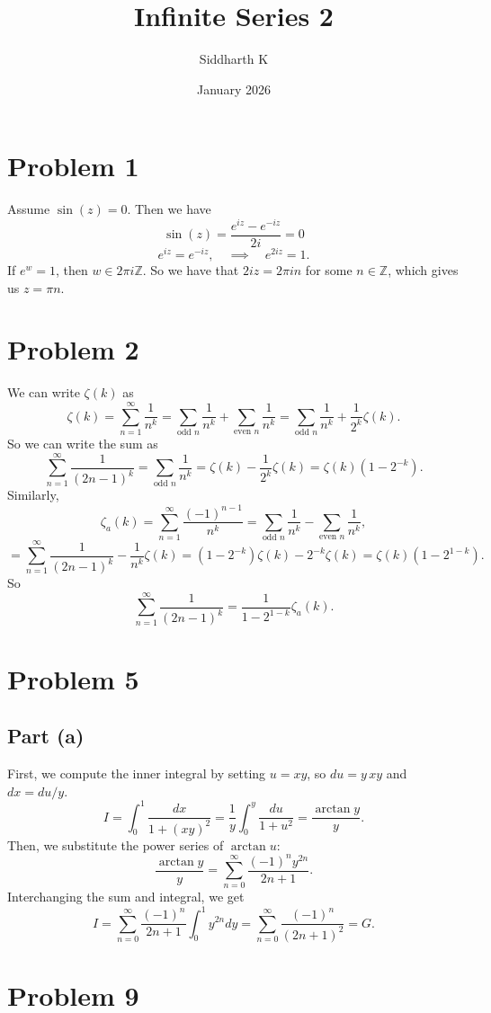 \documentclass{article}
\title{Infinite Series 2}
\author{Siddharth K}
\date{January 2026}
\newcommand{\summation}[1][0]{\sum_{n=#1}^\infty}
\begin{document}
\maketitle

\section*{Problem 1}
Assume $\sin(z) = 0$. Then we have
$$\sin(z) = \frac{e^{iz} - e^{-iz}}{2i} = 0$$
$$e^{iz} = e^{-iz}, \quad \implies \quad e^{2iz} = 1.$$
If $e^w = 1$, then $w \in 2\pi i\mathbb{Z}$. So we have that $2iz = 2\pi in$ for some $n \in \mathbb{Z}$, which gives us $z = \pi n$.

\section*{Problem 2}
We can write $\zeta(k)$ as
$$\zeta(k) = \summation[1] \frac{1}{n^k} = \sum_{\text{odd } n} \frac{1}{n^k} + \sum_{\text{even } n} \frac{1}{n^k} = \sum_{\text{odd } n} \frac{1}{n^k} + \frac{1}{2^k}\zeta(k).$$
So we can write the sum as
$$\summation[1] \frac{1}{(2n - 1)^k} = \sum_{\text{odd } n} \frac{1}{n^k} = \zeta(k) - \frac{1}{2^k}\zeta(k) = \zeta(k)(1 - 2^{-k}).$$
Similarly,
$$\zeta_a(k) = \summation[1] \frac{(-1)^{n - 1}}{n^k} = \sum_{\text{odd } n} \frac{1}{n^k} - \sum_{\text{even } n} \frac{1}{n^k},$$
$$= \summation[1] \frac{1}{(2n - 1)^k} - \frac{1}{n^k}\zeta(k) = (1 - 2^{-k})\zeta(k) - 2^{-k}\zeta(k) = \zeta(k)(1 - 2^{1 - k}).$$
So
$$\summation[1] \frac{1}{(2n - 1)^k} = \frac{1}{1 - 2^{1 - k}}\zeta_a(k).$$

\section*{Problem 5}
\subsection*{Part (a)}
First, we compute the inner integral by setting $u = xy$, so $du = y\,xy$ and $dx = du/y$.
$$I = \int_0^1 \frac{dx}{1 + (xy)^2} = \frac{1}{y}\int_0^y \frac{du}{1 + u^2} = \frac{\arctan y}{y}.$$
Then, we substitute the power series of $\arctan u$:
$$\frac{\arctan y}{y} = \summation \frac{(-1)^n y^{2n}}{2n + 1}.$$
Interchanging the sum and integral, we get
$$I = \summation \frac{(-1)^n}{2n + 1}\int_0^1 y^{2n}dy = \summation \frac{(-1)^n}{(2n + 1)^2} = G.$$

\section*{Problem 9}
\end{document}
